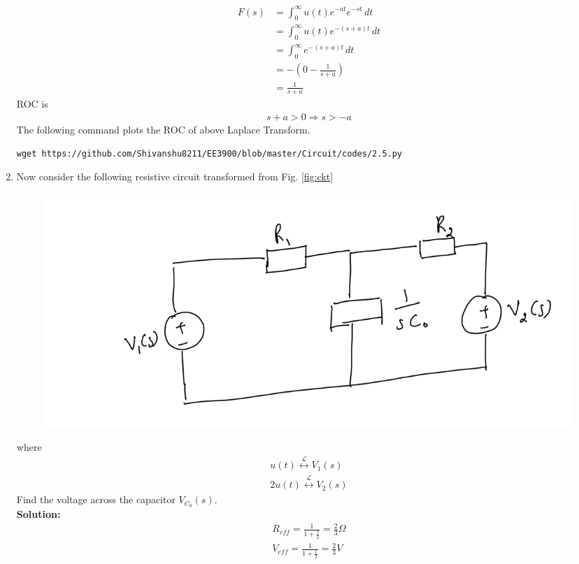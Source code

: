 \documentclass[journal,12pt,twocolumn]{IEEEtran}
\newcommand{\solution}{\noindent \textbf{Solution: }}
\providecommand{\brak}[1]{\ensuremath{\left(#1\right)}}
\providecommand{\system}[1]{\overset{\mathcal{#1}}{ \longleftrightarrow}}
\numberwithin{equation}{section}
\renewcommand\thesection{\arabic{section}}
\begin{document}
\begin{enumerate}[label=\arabic*.,ref=\thesection.\theenumi]
\begin{align}
		F(s)&=\int_{0}^{\infty} u(t)e^{-at}e^{-st} \,dt\\
		&=\int_{0}^{\infty} u(t)e^{-\brak{s+a}t} \,dt\\
		&=\int_{0}^{\infty} e^{-\brak{s+a}t} \,dt\\
		&=-\brak{0-\frac{1}{s+a}}\\
		&=\frac{1}{s+a}
		\end{align}
		ROC is
		\begin{align}
		s+a>0 \Rightarrow s>-a
		\end{align}
		The following command plots the ROC of above Laplace Transform.
	\begin{lstlisting}
wget https://github.com/Shivanshu8211/EE3900/blob/master/Circuit/codes/2.5.py	
\end{lstlisting}
	\item Now consider the following resistive circuit transformed from 
			Fig. \ref{fig:ckt}
		\begin{figure}[!ht]
			\centering
			\includegraphics[width=\columnwidth]{figs/lap-ckt.jpg}
			\caption{}
			\label{fig:lap-ckt}
\end{figure}
		where 
		\begin{align}
			u(t) \system{L} V_1(s)
			\\
			2u(t) \system{L} V_2(s)
		\end{align}
		Find the voltage across the capacitor $V_{C_0}(s)$.\\
		\solution
		\begin{align}
		R_{eff}=\frac{1}{1+\frac{1}{2}}
		=\frac{2}{3} \Omega\\
		V_{eff}=\frac{1}{1+\frac{1}{2}}
		=\frac{2}{3} V
		\end{align}
	

\end{enumerate}
\end{document}
